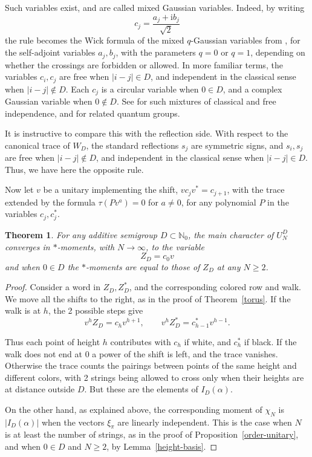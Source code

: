 \documentclass[11pt,a4paper]{article}
\newtheorem{thm}{Theorem}[section]
\begin{document}
Such variables exist, and are called mixed Gaussian variables. Indeed, by writing
\[
 c_j=\frac{a_j+\mathrm{i}b_j}{\sqrt{2}}
\]
the rule becomes the Wick formula of the mixed $q$-Gaussian variables from \cite{jz,speicher-field}, for the self-adjoint variables $a_j,b_j$, with the parameters $q=0$ or $q=1$, depending on whether the crossings are forbidden or allowed. In more familiar terms, the variables $c_i,c_j$ are free when $|i-j|\in D$, and independent in the classical sense when $|i-j|\notin D$. Each $c_j$ is a circular variable when $0\in D$, and a complex Gaussian variable when $0\notin D$. See \cite{cf,mlot,sw} for such mixtures of classical and free independence, and \cite{partial} for related quantum groups.

It is instructive to compare this with the reflection side. With respect to the canonical trace of $W_D$, the standard reflections $s_j$ are symmetric signs, and $s_i,s_j$ are free when $|i-j|\notin D$, and independent in the classical sense when $|i-j|\in D$. Thus, we have here the opposite rule.

Now let $v$ be a unitary implementing the shift, $vc_jv^*=c_{j+1}$, with the trace extended by the formula $\tau(Pv^a)=0$ for $a\neq0$, for any polynomial $P$ in the variables $c_j,c_j^*$.

\begin{thm}\label{unitary-character}
For any additive semigroup $D\subset\mathbb N_0$, the main character of $U_N^D$ converges in $*$-moments, with $N\to\infty$, to the variable
\[
 Z_D=c_0v
\]
and when $0\in D$ the $*$-moments are equal to those of $Z_D$ at any $N\geq2$.
\end{thm}

\begin{proof}
Consider a word in $Z_D,Z_D^*$, and the corresponding colored row and walk. We move all the shifts to the right, as in the proof of Theorem~\ref{torus}. If the walk is at $h$, the 2 possible steps give
\[
 v^hZ_D=c_hv^{h+1},\qquad v^hZ_D^*=c_{h-1}^*v^{h-1}.
\]

Thus each point of height $h$ contributes with $c_h$ if white, and $c_h^*$ if black. If the walk does not end at $0$ a power of the shift is left, and the trace vanishes. Otherwise the trace counts the pairings between points of the same height and different colors, with 2 strings being allowed to cross only when their heights are at distance outside $D$. But these are the elements of $I_D(\alpha)$.

On the other hand, as explained above, the corresponding moment of $\chi_N$ is $|I_D(\alpha)|$ when the vectors $\xi_\pi$ are linearly independent. This is the case when $N$ is at least the number of strings, as in the proof of Proposition~\ref{order-unitary}, and when $0\in D$ and $N\geq2$, by Lemma~\ref{height-basis}.
\end{proof}
\end{document}
